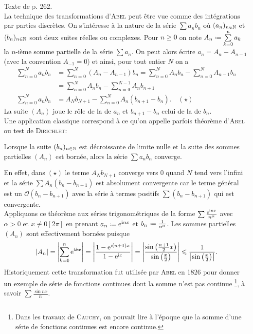 Texte de \cite{oraux_x_ens_3} p. 262. \\

La technique des transformations d'\textsc{Abel} peut être vue comme des intégrations par parties discrètes. On s'intéresse à la nature de la série $\sum a_n b_n$ où $(a_n)_{n \in \mathbb{N}}$ et $(b_n)_{n \in \mathbb{N}}$ sont deux suites réelles ou complexes. Pour $n \geqslant 0$ on note $A_n \defeq \sum\limits_{k=0}^n a_k$ la $n$-ième somme partielle de la série $\sum a_n$. On peut alors écrire $a_n = A_n - A_{n-1}$ (avec la convention $A_{-1} = 0$) et ainsi, pour tout entier $N$ on a
\begin{align*}
    \sum_{n=0}^N a_n b_n &= \sum_{n=0}^N (A_n - A_{n-1})b_n =  \sum_{n=0}^N A_n b_n -  \sum_{n=0}^N A_{n-1}b_n \\
    &= \sum_{n=0}^N A_n b_n - \sum_{n=0}^{N-1} A_n b_{n+1} \\
    \sum_{n=0}^N a_n b_n &= A_N b_{N+1} - \sum_{n=0}^N A_n(b_{n+1}-b_n). \quad (\star)
\end{align*}
La suite $(A_n)$ joue le rôle de la  de $a_n$ et $b_{n+1} - b_n$ celui de la  de $b_n$. \\
Une application classique correspond à ce qu'on appelle parfois théorème d'\textsc{Abel} ou test de \textsc{Dirichlet}: 
\begin{theo}
    Lorsque la suite $(b_n)_{n \in \mathbb{N}}$ est décroissante de limite nulle et la suite des sommes partielles $(A_n)$ est bornée, alors la série $\sum a_n b_n$ converge. 
\end{theo}

En effet, dans $(\star)$ le terme $A_N b_{N+1}$ converge vers $0$ quand $N$ tend vers l'infini et la série $\sum A_n(b_n - b_{n+1})$ est absolument convergente car le terme général est un $\mathcal{O}(b_n - b_{n+1})$ avec la série à termes positifs $\sum(b_n - b_{n+1})$ qui est convergente. \\
Appliquons ce théorème aux séries trigonométriques de la forme $\sum \frac{\mathrm{e}^{\mathrm{i} n x}}{n^\alpha}$ avec $\alpha > 0$ et $x \not \equiv 0 [2\pi]$ en prenant $a_n \defeq \me^{\mi n x}$ et $b_n \defeq \frac{1}{n^\alpha}$. Les sommes partielles $(A_n)$ sont effectivement bornées puisque
$$|A_n| = \left| \sum_{k=0}^n \mathrm{e}^{\mathrm{i} k x}\right| = \left| \frac{1 - \mathrm{e}^{\mathrm{i} (n+1)x}}{1-\mathrm{e}^{\mathrm{i} x}} \right| = \left| \frac{\sin \left( \frac{n+1}{2} x\right)}{\sin \left( \frac{x}{2} \right)} \right| \leqslant \frac{1}{\left| \sin \left( \frac{x}{2} \right) \right|}.$$
Historiquement cette transformation fut utilisée par \textsc{Abel} en 1826 pour donner un exemple de série de fonctions continues dont la somme n'est pas continue \footnote{Dans les travaux de \textsc{Cauchy}, on pouvait lire à l'époque que la somme d'une série de fonctions continues est encore continue.}, à savoir $\sum \frac{\sin nx}{n}$.
